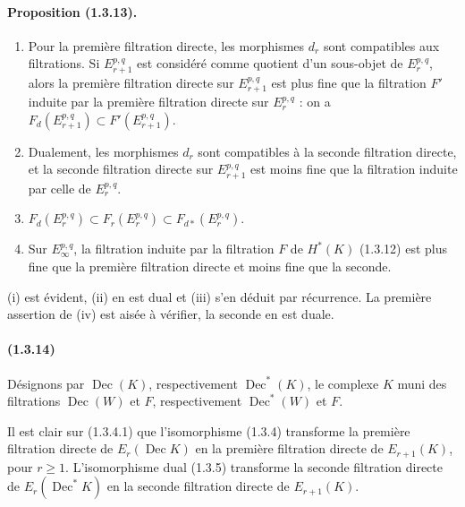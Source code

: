\documentclass[10pt]{article}
\newcommand{\Dec}{\operatorname{Dec}}
\begin{document}
\paragraph{Proposition (1.3.13).}
\begin{enumerate}[label=(\roman*)]
\item Pour la première filtration directe, les morphismes $d_r$ sont compatibles aux filtrations. Si $E_{r+1}^{p,q}$ est considéré comme quotient d'un sous-objet de $E_r^{p,q}$, alors la première filtration directe sur $E_{r+1}^{p,q}$ est plus fine que la filtration $F'$ induite par la première filtration directe sur $E_r^{p,q}$ : on a $F_d(E_{r+1}^{p,q})\subset F'(E_{r+1}^{p,q})$.
\item Dualement, les morphismes $d_r$ sont compatibles à la seconde filtration directe, et la seconde filtration directe sur $E_{r+1}^{p,q}$ est moins fine que la filtration induite par celle de $E_r^{p,q}$.
\item $F_d(E_r^{p,q})\subset F_r(E_r^{p,q})\subset F_{d*}(E_r^{p,q})$.
\item Sur $E_\infty^{p,q}$, la filtration induite par la filtration $F$ de $H^*(K)$ (1.3.12) est plus fine que la première filtration directe et moins fine que la seconde.
\end{enumerate}
(i) est évident, (ii) en est dual et (iii) s'en déduit par récurrence. La première assertion de (iv) est aisée à vérifier, la seconde en est duale.

\paragraph{(1.3.14)} Désignons par $\Dec(K)$, respectivement $\Dec^*(K)$, le complexe $K$ muni des filtrations $\Dec(W)$ et $F$, respectivement $\Dec^*(W)$ et $F$.

Il est clair sur (1.3.4.1) que l'isomorphisme (1.3.4) transforme la première filtration directe de $E_r(\Dec K)$ en la première filtration directe de $E_{r+1}(K)$, pour $r\ge1$. L'isomorphisme dual (1.3.5) transforme la seconde filtration directe de $E_r(\Dec^*K)$ en la seconde filtration directe de $E_{r+1}(K)$.
\end{document}
